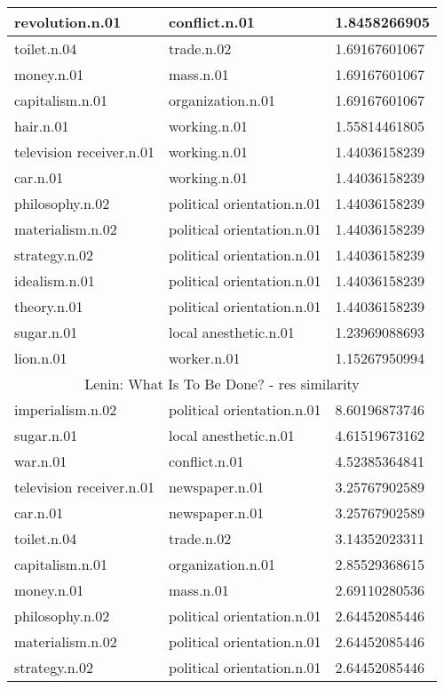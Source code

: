 \begin{center}
\begin{tabular}{ | l | l | l |}
revolution.n.01 & conflict.n.01 & 1.8458266905\\ \hline
toilet.n.04 & trade.n.02 & 1.69167601067\\ \hline
money.n.01 & mass.n.01 & 1.69167601067\\ \hline
capitalism.n.01 & organization.n.01 & 1.69167601067\\ \hline
hair.n.01 & working.n.01 & 1.55814461805\\ \hline
television receiver.n.01 & working.n.01 & 1.44036158239\\ \hline
car.n.01 & working.n.01 & 1.44036158239\\ \hline
philosophy.n.02 & political orientation.n.01 & 1.44036158239\\ \hline
materialism.n.02 & political orientation.n.01 & 1.44036158239\\ \hline
strategy.n.02 & political orientation.n.01 & 1.44036158239\\ \hline
idealism.n.01 & political orientation.n.01 & 1.44036158239\\ \hline
theory.n.01 & political orientation.n.01 & 1.44036158239\\ \hline
sugar.n.01 & local anesthetic.n.01 & 1.23969088693\\ \hline
lion.n.01 & worker.n.01 & 1.15267950994\\ \hline
\multicolumn{3}{|c|}{Lenin: What Is To Be Done? - res similarity} \\ \hline
imperialism.n.02 & political orientation.n.01 & 8.60196873746\\ \hline
sugar.n.01 & local anesthetic.n.01 & 4.61519673162\\ \hline
war.n.01 & conflict.n.01 & 4.52385364841\\ \hline
television receiver.n.01 & newspaper.n.01 & 3.25767902589\\ \hline
car.n.01 & newspaper.n.01 & 3.25767902589\\ \hline
toilet.n.04 & trade.n.02 & 3.14352023311\\ \hline
capitalism.n.01 & organization.n.01 & 2.85529368615\\ \hline
money.n.01 & mass.n.01 & 2.69110280536\\ \hline
philosophy.n.02 & political orientation.n.01 & 2.64452085446\\ \hline
materialism.n.02 & political orientation.n.01 & 2.64452085446\\ \hline
strategy.n.02 & political orientation.n.01 & 2.64452085446\\ \hline

\end{tabular}
\end{center}
